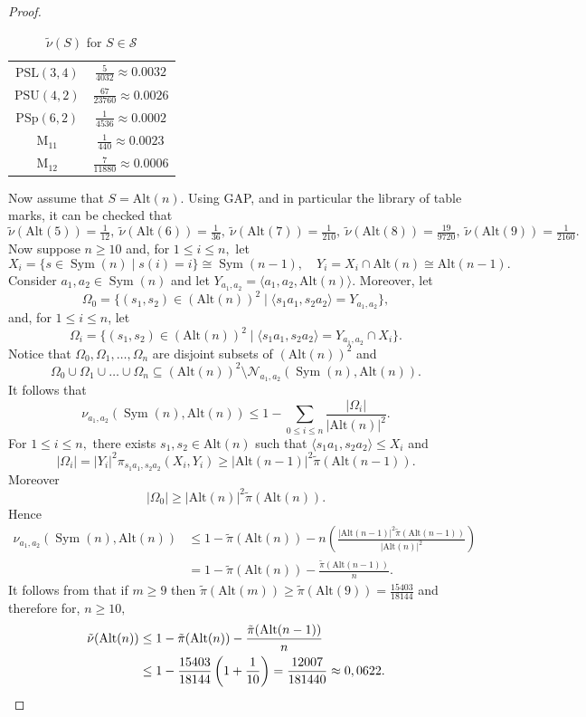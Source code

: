 \documentclass{amsart}
\DeclareMathOperator{\perm}{Sym}
\DeclareMathOperator{\M}{M}
\newcommand{\alt}{\mathrm{Alt}}
\numberwithin{equation}{section}
\begin{document}
\begin{proof}
\begin{table}[h]
\begin{tabular}{cc}
		$\mathrm{PSL}(3,4)$  & $\tfrac{5}{4032}  \approx 0.0032$ \\
		$\mathrm{PSU}(4,2)$  & $\tfrac{67}{23760} \approx 0.0026$ \\
		$\mathrm{PSp}(6,2)$  & $\tfrac{1}{4536}  \approx 0.0002$ \\
		$\M_{11}$   & $\tfrac{1}{440}   \approx 0.0023$ \\
		$\M_{12}$   & $\tfrac{7}{11880} \approx 0.0006$ \\
		\bottomrule
	\end{tabular}
	\caption{$\tilde\nu(S)$ for $S\in \mathcal S$}
	\label{tabnu}
\end{table}

Now assume that $S=\alt(n)$. Using GAP, and in particular the library of table marks, it can be checked 
that
$$\tilde\nu(\alt(5))=\tfrac{1}{12}, \
\tilde\nu(\alt(6))=\tfrac{1}{36}, \
\tilde\nu(\alt(7))=\tfrac{1}{210},\
\tilde\nu(\alt(8))=\tfrac{19}{9720}, \
\tilde\nu(\alt(9))=\tfrac{1}{2160}.$$
Now suppose $n\geq 10$ and, for $1\leq i\leq n,$ let $$X_i=
\{s\in \perm(n)\mid s(i)=i\}\cong \perm(n-1),\quad Y_i=X_i\cap \alt(n)\cong \alt(n-1).$$
Consider $a_1,a_2\in \perm(n)$ and let $Y_{a_1,a_2}=\langle a_1,a_2,\alt(n)\rangle.$ Moreover, let
$$\Omega_0=\{(s_1,s_2)\in (\alt(n))^2\mid \langle s_1a_1,s_2a_2\rangle=Y_{a_1,a_2}\},$$
and,  for $1\leq i\leq n$, let 
$$\Omega_i=\{(s_1,s_2)\in (\alt(n))^2\mid  \langle s_1a_1,s_2a_2\rangle = Y_{a_1,a_2}\cap X_i\}.$$
Notice that $\Omega_0, \Omega_1,\dots,\Omega_n$ are disjoint subsets of $(\alt(n))^2$ and
$$\Omega_0\cup \Omega_1\cup \dots \cup \Omega_n\subseteq (\alt(n))^2\setminus \mathcal N_{a_1,a_2}(\perm(n),\alt(n)).$$ It follows that
$$\nu_{a_1,a_2}(\perm(n),\alt(n))\leq 1-\sum_{0\leq i\leq n}\frac{|\Omega_i|}{|\alt(n)|^2}.
$$
For $1\leq i\leq n,$ there exists $s_1, s_2\in \alt(n)$ such that $\langle s_1a_1, s_2a_2\rangle \leq X_i$ and
$$|\Omega_i|=|Y_i|^2\pi_{s_1a_1,s_2a_2}(X_i,Y_i)\geq |\alt(n-1)|^2\tilde\pi(\alt(n-1)).$$
Moreover $$|\Omega_0|\geq |\alt(n)|^2\tilde\pi(\alt(n)).$$
Hence $$\begin{aligned}\nu_{a_1,a_2}(\perm(n),\alt(n))&\leq 
1-\tilde\pi(\alt(n))-n\left(\frac{|\alt(n-1)|^2\tilde\pi(\alt(n-1))}{|\alt(n)|^2}\right)\\&=1-\tilde \pi(\alt(n))-\frac{\tilde\pi(\alt(n-1))}{n}.\end{aligned}$$
It follows from  \cite{nina} that if $m\geq 9$ then $\tilde\pi(\alt(m))\geq \tilde\pi(\alt(9))=\frac{15403}{18144}$ and therefore
for, $n\geq 10,$
$$\begin{aligned}\tilde\nu(\alt(n))&\leq 1-\tilde \pi(\alt(n))-\frac{\tilde\pi(\alt(n-1))}{n}\\&\leq 1-\frac{15403}{18144}\left(1+\frac{1}{10}\right)=\frac{12007}{181440}\approx 0,0622.\qedhere
\end{aligned}
	$$
\end{proof}
\end{document}
